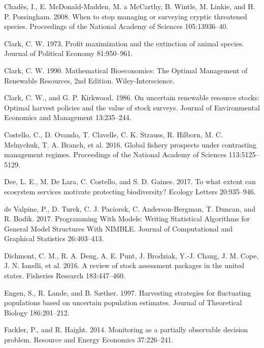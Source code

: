 \documentclass[3p]{elsarticle} %
\begin{document}
\leavevmode\hypertarget{ref-Chades2008}{}%
Chadès, I., E. McDonald-Madden, M. a McCarthy, B. Wintle, M. Linkie, and
H. P. Possingham. 2008. When to stop managing or surveying cryptic
threatened species. Proceedings of the National Academy of Sciences
105:13936--40.

\leavevmode\hypertarget{ref-Clark1973}{}%
Clark, C. W. 1973. Profit maximization and the extinction of animal
species. Journal of Political Economy 81:950--961.

\leavevmode\hypertarget{ref-Clark1990}{}%
Clark, C. W. 1990. Mathematical Bioeconomics: The Optimal Management of
Renewable Resources, 2nd Edition. Wiley-Interscience.

\leavevmode\hypertarget{ref-Clark1986}{}%
Clark, C. W., and G. P. Kirkwood. 1986. On uncertain renewable resource
stocks: Optimal harvest policies and the value of stock surveys. Journal
of Environmental Economics and Management 13:235--244.

\leavevmode\hypertarget{ref-Costello2016}{}%
Costello, C., D. Ovando, T. Clavelle, C. K. Strauss, R. Hilborn, M. C.
Melnychuk, T. A. Branch, et al. 2016. Global fishery prospects under
contrasting management regimes. Proceedings of the National Academy of
Sciences 113:5125--5129.

\leavevmode\hypertarget{ref-Dee2017}{}%
Dee, L. E., M. De Lara, C. Costello, and S. D. Gaines. 2017. To what
extent can ecosystem services motivate protecting biodiversity? Ecology
Letters 20:935--946.

\leavevmode\hypertarget{ref-nimble}{}%
de Valpine, P., D. Turek, C. J. Paciorek, C. Anderson-Bergman, T.
Duncan, and R. Bodik. 2017. Programming With Models: Writing Statistical
Algorithms for General Model Structures With NIMBLE. Journal of
Computational and Graphical Statistics 26:403--413.

\leavevmode\hypertarget{ref-Dichmont2016}{}%
Dichmont, C. M., R. A. Deng, A. E. Punt, J. Brodziak, Y.-J. Chang, J. M.
Cope, J. N. Ianelli, et al. 2016. A review of stock assessment packages
in the united states. Fisheries Research 183:447--460.

\leavevmode\hypertarget{ref-Engen1997}{}%
Engen, S., R. Lande, and B. Sæther. 1997. Harvesting strategies for
fluctuating populations based on uncertain population estimates. Journal
of Theoretical Biology 186:201--212.

\leavevmode\hypertarget{ref-Fackler2014b}{}%
Fackler, P., and R. Haight. 2014. Monitoring as a partially observable
decision problem. Resource and Energy Economics 37:226--241.
\end{document}
